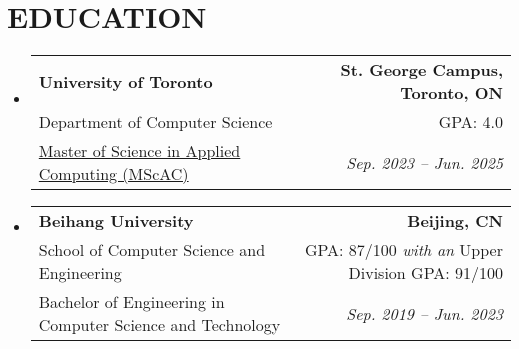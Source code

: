 \documentclass[letterpaper,11pt]{article}
\makeatletter
\newcommand{\education}[6]{
  \vspace{-2pt}\item
    \begin{tabular*}{1.0\textwidth}[t]{l@{\extracolsep{\fill}}r}
      \textbf{#1} & \textbf{\small{#2}} \\
      {#5} & {#6} \\
      {#3} & \textit{ #4} \\
    \end{tabular*}\vspace{-7pt}
}
\newcommand{\resumeSubHeadingListStart}{\begin{itemize}[leftmargin=0.0in, label={}]}
\newcommand{\resumeSubHeadingListEnd}{\end{itemize}}
\makeatother
\begin{document}
\section{EDUCATION}
  \resumeSubHeadingListStart
    \education
      {University of Toronto}{St. George Campus, Toronto, ON}
      {\href{https://mscac.utoronto.ca/}{Master of Science in Applied Computing (MScAC)}}{Sep. 2023 -- Jun. 2025}
      {Department of Computer Science}{GPA: 4.0}
    \education
      {Beihang University}{Beijing, CN}
      {Bachelor of Engineering in Computer Science and Technology}{Sep. 2019 -- Jun. 2023}
      {School of Computer Science and Engineering}{GPA: 87/100 \textit{with an} Upper Division GPA: 91/100}
  \resumeSubHeadingListEnd
\end{document}
